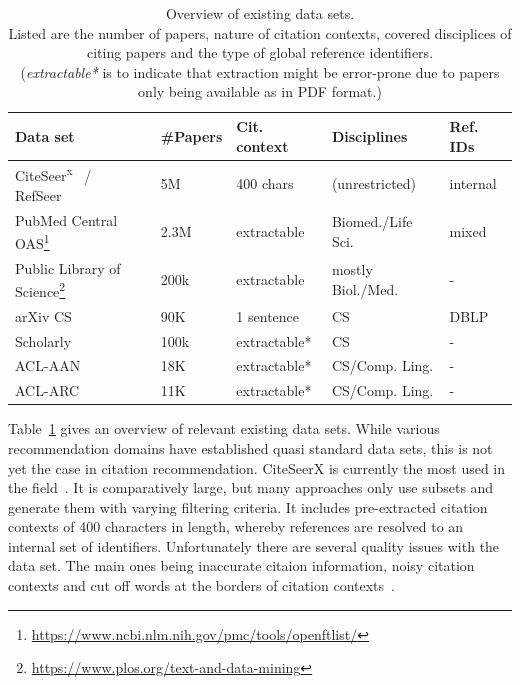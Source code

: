 \begin{table}
\centering
    \caption[Overview of existing data sets.]{Overview of existing data sets.\\Listed are the number of papers, nature of citation contexts, covered disciplices of citing papers and the type of global reference identifiers.\\(\emph{extractable*} is to indicate that extraction might be error-prone due to papers only being available as in PDF format.)}
    \label{tab:datasets}
\begin{center}
    \begin{tabular}{lllll}
    \toprule
    Data set & \#Papers & Cit. context & Disciplines & Ref. IDs \\
    \midrule
    CiteSeer\textsuperscript{x}~\cite{Caragea2014} / RefSeer~\cite{Huang2014} & 5M & 400 chars & (unrestricted) & internal \\
    PubMed Central OAS\footnote{\url{https://www.ncbi.nlm.nih.gov/pmc/tools/openftlist/}} & 2.3M & extractable & Biomed./Life Sci. & mixed \\
    Public Library of Science\footnote{\url{https://www.plos.org/text-and-data-mining}} & 200k & extractable & mostly Biol./Med. & - \\
    arXiv CS~\cite{Faerber2018} &  90K & 1 sentence & CS & DBLP \\
    Scholarly~\cite{Sugiyama2013}  & 100k & extractable* & CS & - \\
    ACL-AAN~\cite{Radev2013} & 18K & extractable* & CS/Comp. Ling. & -  \\
    ACL-ARC~\cite{Bird2008} & 11K & extractable* & CS/Comp. Ling. & - \\
    \bottomrule
    \end{tabular}
\end{center}
\end{table}

Table~\ref{tab:datasets} gives an overview of relevant existing data sets. While various recommendation domains have established quasi standard data sets, this is not yet the case in citation recommendation. CiteSeerX is currently the most used in the field~\cite{Beel2016}. It is comparatively large, but many approaches only use subsets and generate them with varying filtering criteria. It includes pre-extracted citation contexts of 400 characters in length, whereby references are resolved to an internal set of identifiers. Unfortunately there are several quality issues with the data set. The main ones being inaccurate citaion information, noisy citation contexts and cut off words at the borders of citation contexts~\cite{Roy2016}.


